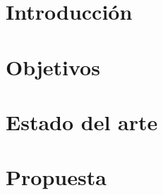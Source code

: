 \documentclass[a4paper,11pt]{report}
\begin{document}
\renewcommand{\contentsname}{Índice}
\renewcommand{\chaptername}{Capítulo}
\renewcommand{\figurename}{Figura}
\renewcommand{\listfigurename}{Índice de figuras}
\renewcommand{\tablename}{Tabla}
\renewcommand{\listtablename}{Índice de tablas}
\renewcommand\bibname{Bibliografía}

\pagestyle{empty}

\pagebreak
\newpage
\thispagestyle{empty}
\mbox{}
\pagestyle{plain}

\tableofcontents

\chapter{Introducción}


\chapter{Objetivos}


\chapter{Estado del arte}


\chapter{Propuesta}




\end{document}
